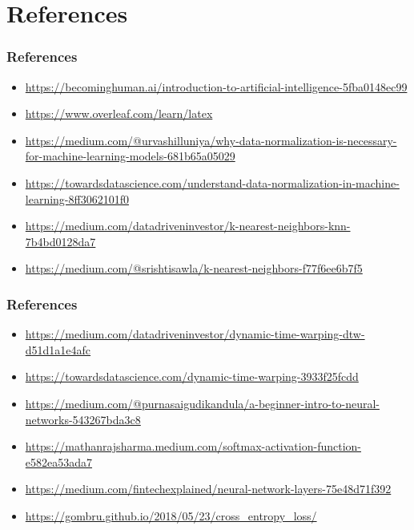 \documentclass{beamer}
\begin{document}
\section{References}

\begin{frame}
\frametitle{References}
\begin{itemize}

\item \textcolor{blue}{\url{https://becominghuman.ai/introduction-to-artificial-intelligence-5fba0148ec99}}
\item \textcolor{blue}{\url{https://www.overleaf.com/learn/latex}}
\item \textcolor{blue}{\url{https://medium.com/@urvashilluniya/why-data-normalization-is-necessary-for-machine-learning-models-681b65a05029}}
\item \textcolor{blue}{\url{https://towardsdatascience.com/understand-data-normalization-in-machine-learning-8ff3062101f0}}
\item \textcolor{blue}{\url{https://medium.com/datadriveninvestor/k-nearest-neighbors-knn-7b4bd0128da7}}
\item \textcolor{blue}{\url{https://medium.com/@srishtisawla/k-nearest-neighbors-f77f6ee6b7f5}}

\end{itemize}
\end{frame}

\begin{frame}
\frametitle{References}
\begin{itemize}
\item \textcolor{blue}{\url{https://medium.com/datadriveninvestor/dynamic-time-warping-dtw-d51d1a1e4afc}}
\item \textcolor{blue}{\url{https://towardsdatascience.com/dynamic-time-warping-3933f25fcdd}}
\item \textcolor{blue}{\url{https://medium.com/@purnasaigudikandula/a-beginner-intro-to-neural-networks-543267bda3c8}}
\item \textcolor{blue}{\url{https://mathanrajsharma.medium.com/softmax-activation-function-e582ea53ada7}}
\item \textcolor{blue}{\url{https://medium.com/fintechexplained/neural-network-layers-75e48d71f392}}
\item \textcolor{blue}{\url{https://gombru.github.io/2018/05/23/cross_entropy_loss/}}
\end{itemize}
\end{frame}
\end{document}
